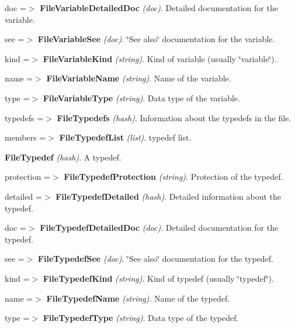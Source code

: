 \begin{DoxyItemize}
\begin{DoxyItemize}
\begin{DoxyItemize}
\begin{DoxyItemize}
\begin{DoxyItemize}
\begin{DoxyItemize}
\begin{DoxyItemize}
\begin{DoxyItemize}
\item doc =$>$ {\bfseries FileVariableDetailedDoc} {\itshape (doc)\/}. Detailed documentation for the variable. 
\item see =$>$ {\bfseries FileVariableSee} {\itshape (doc)\/}. \char`\"{}See also\char`\"{} documentation for the variable. 
\end{DoxyItemize}
\item kind =$>$ {\bfseries FileVariableKind} {\itshape (string)\/}. Kind of variable (usually \char`\"{}variable\char`\"{}). 
\item name =$>$ {\bfseries FileVariableName} {\itshape (string)\/}. Name of the variable. 
\item type =$>$ {\bfseries FileVariableType} {\itshape (string)\/}. Data type of the variable. 
\end{DoxyItemize}
\end{DoxyItemize}
\end{DoxyItemize}
\item typedefs =$>$ {\bfseries FileTypedefs} {\itshape (hash)\/}. Information about the typedefs in the file. 
\begin{DoxyItemize}
\item members =$>$ {\bfseries FileTypedefList} {\itshape (list)\/}. typedef list. 
\begin{DoxyItemize}
\item {\bfseries FileTypedef} {\itshape (hash)\/}. A typedef. 
\begin{DoxyItemize}
\item protection =$>$ {\bfseries FileTypedefProtection} {\itshape (string)\/}. Protection of the typedef. 
\item detailed =$>$ {\bfseries FileTypedefDetailed} {\itshape (hash)\/}. Detailed information about the typedef. 
\begin{DoxyItemize}
\item doc =$>$ {\bfseries FileTypedefDetailedDoc} {\itshape (doc)\/}. Detailed documentation for the typedef. 
\item see =$>$ {\bfseries FileTypedefSee} {\itshape (doc)\/}. \char`\"{}See also\char`\"{} documentation for the typedef. 
\end{DoxyItemize}
\item kind =$>$ {\bfseries FileTypedefKind} {\itshape (string)\/}. Kind of typedef (usually \char`\"{}typedef\char`\"{}). 
\item name =$>$ {\bfseries FileTypedefName} {\itshape (string)\/}. Name of the typedef. 
\item type =$>$ {\bfseries FileTypedefType} {\itshape (string)\/}. Data type of the typedef. 
\end{DoxyItemize}
\end{DoxyItemize}
\end{DoxyItemize}
\end{DoxyItemize}
\end{DoxyItemize}
\end{DoxyItemize}
\end{DoxyItemize}